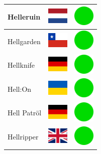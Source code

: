 \documentclass[12pt, a4paper, twoside]{report}
\begin{document}
\begin{center}
\begin{longtable}{|p{5cm}|p{2cm}|p{2cm}|}
 Helleruin                                                  & \includegraphics[width=1cm]{../img/flags/nl} &   \includegraphics[width=1cm]{../likes/y} \\ \hline
 Hellgarden                                                 & \includegraphics[width=1cm]{../img/flags/cl} &   \includegraphics[width=1cm]{../likes/y} \\ \hline
 Hellknife                                                  & \includegraphics[width=1cm]{../img/flags/de} &   \includegraphics[width=1cm]{../likes/y} \\ \hline
 Hell:On                                                    & \includegraphics[width=1cm]{../img/flags/ua} &   \includegraphics[width=1cm]{../likes/y} \\ \hline
 Hell Patröl                                                & \includegraphics[width=1cm]{../img/flags/de} &   \includegraphics[width=1cm]{../likes/y} \\ \hline
 Hellripper                                                 & \includegraphics[width=1cm]{../img/flags/gb} &   \includegraphics[width=1cm]{../likes/y} \\ \hline

\end{longtable}
\end{center}
\end{document}
